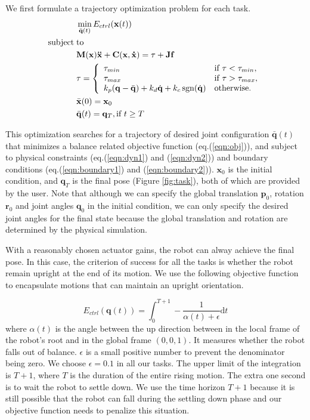 We first formulate a trajectory optimization problem for each task.
\begin{align}
 \label{eqn:obj}&\min_{\bar{\mathbf{q}}(t)} E_{ctrl}(\mathbf{x}(t))\\
\nonumber  \mathrm{subject\;} &\mathrm{to} \\
\label{eqn:dyn1} & \mathbf{M}(\mathbf{x})\mathbf{\ddot{x}}+\mathbf{C}(\mathbf{x},\mathbf{\dot{x}}) =\tau + \mathbf{Jf}\\
\label{eqn:dyn2} &\tau =
  \left\{
    \begin{array}{ll}
      \tau_{min} & \text{if }\tau < \tau_{min},\\
      \tau_{max} & \text{if }\tau > \tau_{max},\\
      k_p(\mathbf{q}-\bar{\mathbf{q}}) + k_d\dot{\mathbf{q}} + k_c\operatorname{sgn}(\dot{\mathbf{q}}) & \text{otherwise.}\\
    \end{array}
  \right.\\
\label{eqn:boundary1}&\bar{\mathbf{x}}(0) = \mathbf{x}_0\\
\label{eqn:boundary2}&\bar{\mathbf{q}}(t) = \mathbf{q}_T, \text{if } t \geq T
\end{align}

This optimization searches for a trajectory of desired joint configuration $\bar{\mathbf{q}}(t)$ that minimizes a balance related objective function (eq.(\ref{eqn:obj})), and subject to physical constraints (eq.(\ref{eqn:dyn1}) and (\ref{eqn:dyn2})) and boundary conditions (eq.(\ref{eqn:boundary1}) and (\ref{eqn:boundary2})). $\mathbf{x}_0$ is the initial condition, and $\mathbf{q}_T$ is the final pose (Figure \ref{fig:task}), both of which are provided by the user. Note that although we can specify the global translation $\mathbf{p}_0$, rotation $\mathbf{r}_0$ and joint angles $\mathbf{q}_0$ in the initial condition, we can only specify the desired joint angles for the final state because the global translation and rotation are determined by the physical simulation.

With a reasonably chosen actuator gains, the robot can alway achieve the final pose. In this case, the criterion of success for all the tasks is whether the robot remain upright at the end of its motion. We use the following objective function to encapsulate motions that can maintain an upright orientation.

\begin{equation}
  E_{ctrl}(\mathbf{q}(t))=\int_0^{T+1} -\frac{1}{\alpha(t)+\epsilon}\mathrm{d}t
  \label{eqn:controllerObj}
\end{equation}
where $\alpha(t)$ is the angle between the up direction between in the local frame of the robot's root and in the global frame $(0,0,1)$. It measures whether the robot falls out of balance. $\epsilon$ is a small positive number to prevent the denominator being zero. We choose $\epsilon=0.1$ in all our tasks. The upper limit of the integration is $T+1$, where $T$ is the duration of the entire rising motion. The extra one second is to wait the robot to settle down. We use the time horizon $T+1$ because it is still possible that the robot can fall during the settling down phase and our objective function needs to penalize this situation.

